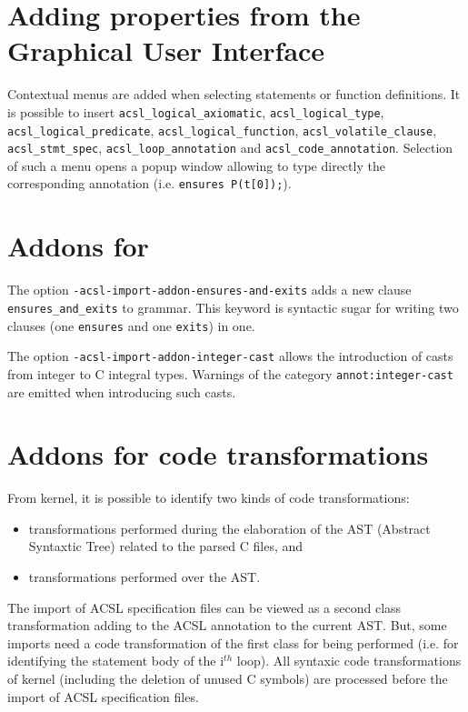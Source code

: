 \documentclass{frama-c-book}
\begin{document}
\section*{Adding properties from the Graphical User Interface}
\markright{}
Contextual menus are added when selecting statements or function definitions.
It is possible to insert \verb|acsl_logical_axiomatic|, \verb|acsl_logical_type|,
           \verb|acsl_logical_predicate|, \verb|acsl_logical_function|,
           \verb|acsl_volatile_clause|, \verb|acsl_stmt_spec|,
           \verb|acsl_loop_annotation| and \verb|acsl_code_annotation|.
Selection of such a menu opens a popup window allowing to type directly the corresponding annotation (i.e. \verb|ensures P(t[0]);|).

\section*{Addons for \acsl}
\markright{}
The option \verb|-acsl-import-addon-ensures-and-exits| adds a new clause \verb|ensures_and_exits| to \acsl grammar. This keyword is syntactic sugar for writing two clauses (one \verb|ensures| and one \verb|exits|) in one.

The option \verb|-acsl-import-addon-integer-cast| allows the introduction of casts from integer to C integral types. Warnings of the category \verb|annot:integer-cast| are emitted when introducing such casts.


\section*{Addons for code transformations}
\markright{}
From \FramaC kernel, it is possible to identify two kinds of code transformations:
\begin{itemize}
\item transformations performed during the elaboration of the AST (Abstract Syntaxtic Tree) related to the parsed C files, and
\item transformations performed over the AST.
\end{itemize}

The import of ACSL specification files can be viewed as a second class transformation adding to the ACSL annotation to the current AST.
But, some imports need a code transformation of the first class for being performed (i.e. for identifying the statement body of the i$^{th}$ loop).
All syntaxic code transformations of \FramaC kernel (including the deletion of unused C symbols) are processed before the import of ACSL specification files.
\end{document}
